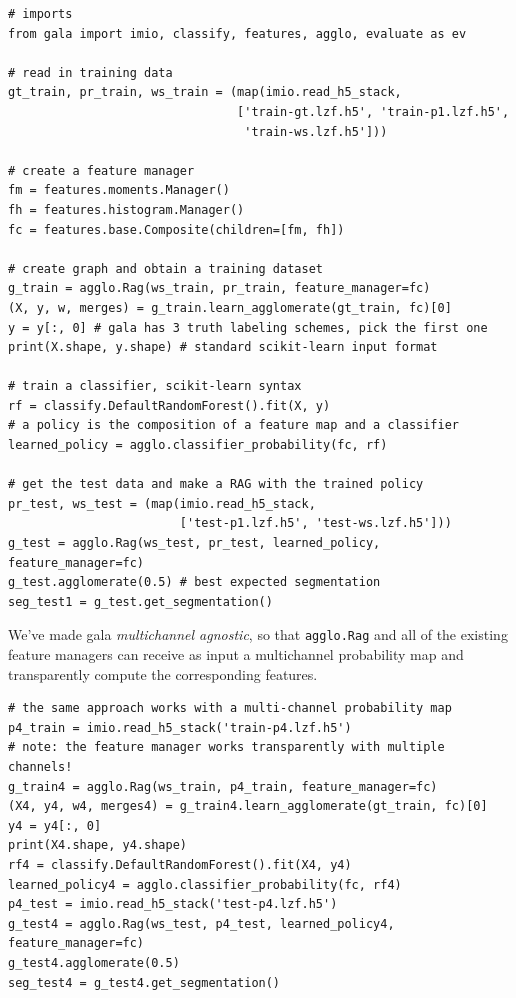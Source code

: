 \documentclass{frontiersSCNS} %
\begin{document}
{\small
\begin{verbatim}
# imports
from gala import imio, classify, features, agglo, evaluate as ev

# read in training data
gt_train, pr_train, ws_train = (map(imio.read_h5_stack,
                                ['train-gt.lzf.h5', 'train-p1.lzf.h5',
                                 'train-ws.lzf.h5']))

# create a feature manager
fm = features.moments.Manager()
fh = features.histogram.Manager()
fc = features.base.Composite(children=[fm, fh])

# create graph and obtain a training dataset
g_train = agglo.Rag(ws_train, pr_train, feature_manager=fc)
(X, y, w, merges) = g_train.learn_agglomerate(gt_train, fc)[0]
y = y[:, 0] # gala has 3 truth labeling schemes, pick the first one
print(X.shape, y.shape) # standard scikit-learn input format

# train a classifier, scikit-learn syntax
rf = classify.DefaultRandomForest().fit(X, y)
# a policy is the composition of a feature map and a classifier
learned_policy = agglo.classifier_probability(fc, rf)

# get the test data and make a RAG with the trained policy
pr_test, ws_test = (map(imio.read_h5_stack,
                        ['test-p1.lzf.h5', 'test-ws.lzf.h5']))
g_test = agglo.Rag(ws_test, pr_test, learned_policy, feature_manager=fc)
g_test.agglomerate(0.5) # best expected segmentation
seg_test1 = g_test.get_segmentation()
\end{verbatim}
}

We've made gala \emph{multichannel agnostic}, so that \texttt{agglo.Rag} and all of the existing feature managers can receive as input a multichannel probability map and transparently compute the corresponding features.

{\small
\begin{verbatim}
# the same approach works with a multi-channel probability map
p4_train = imio.read_h5_stack('train-p4.lzf.h5')
# note: the feature manager works transparently with multiple channels!
g_train4 = agglo.Rag(ws_train, p4_train, feature_manager=fc)
(X4, y4, w4, merges4) = g_train4.learn_agglomerate(gt_train, fc)[0]
y4 = y4[:, 0]
print(X4.shape, y4.shape)
rf4 = classify.DefaultRandomForest().fit(X4, y4)
learned_policy4 = agglo.classifier_probability(fc, rf4)
p4_test = imio.read_h5_stack('test-p4.lzf.h5')
g_test4 = agglo.Rag(ws_test, p4_test, learned_policy4, feature_manager=fc)
g_test4.agglomerate(0.5)
seg_test4 = g_test4.get_segmentation()
\end{verbatim}
}
\end{document}
